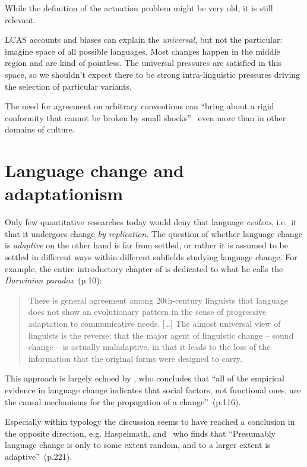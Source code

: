 While the definition of the actuation problem might be very old, it is still relevant.

LCAS accounts and biases can explain the \emph{universal}, but not the particular: imagine space of all possible languages. Most changes happen in the middle region and are kind of pointless. The universal pressures are satisfied in this space, so we shouldn't expect there to be strong intra-linguistic pressures driving the selection of particular variants.

The need for agreement on arbitrary conventions can ``bring about a rigid conformity that cannot be broken by small shocks''~\citep{Bikhchandani1992} even more than in other domains of culture.

\section{Language change and adaptationism}

Only few quantitative researches today would deny that language \emph{evolves}, i.e.~it that it undergoes change \emph{by replication}. The question of whether language change is \emph{adaptive} on the other hand is far from settled, or rather it is assumed to be settled in different ways within different subfields studying language change.
For example, the entire introductory chapter of \citet{Labov2001} is dedicated to what he calls the \emph{Darwinian paradox}~(p.10): 
\begin{quotation}
There is general agreement among 20th-century linguists that language does not show an evolutionary pattern in the sense of progressive adaptation to communicative needs. [\ldots] The almost universal view of linguists is the reverse: that the major agent of linguistic change -- sound change -- is actually maladaptive, in that it leads to the loss of the information that the original forms were designed to carry.
\end{quotation}

This approach is largely echoed by \citet{Croft2006}, who concludes that ``all of the empirical evidence in language change indicates that social factors, not functional ones, are the causal mechanisms for the propagation of a change''~(p.116).

Especially within typology the discussion seems to have reached a conclusion in the opposite direction, e.g. Haspelmath, and~\citet{Wichmann2015} who finds that ``Presumably language change is only to some extent random, and to a larger extent is adaptive''~(p.221).

